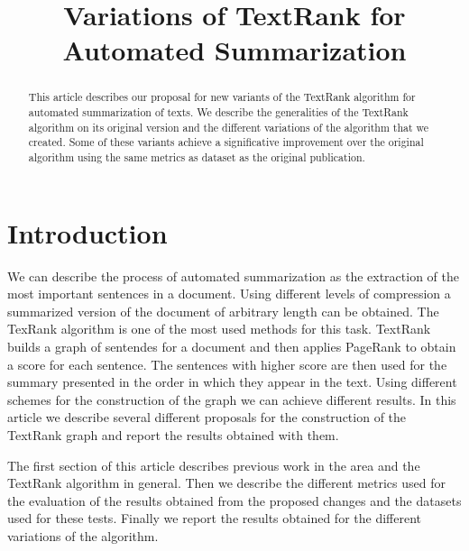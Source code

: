 \documentclass{llncs}
\begin{document}
\frontmatter

\title{Variations of TextRank for Automated Summarization}


\maketitle

\begin{abstract}
This article describes our proposal for new variants of the TextRank algorithm for automated summarization of texts. We describe the generalities of the TextRank algorithm on its original version and the different variations of the algorithm that we created. Some of these variants achieve a significative improvement over the original algorithm using the same metrics as dataset as the original publication. 

\end{abstract}

\section{Introduction}
We can describe the process of automated summarization as the extraction of the most important sentences in a document. Using different levels of compression a summarized version of the document of arbitrary length can be obtained. The TexRank algorithm is one of the most used methods for this task. TextRank builds a graph of sentendes for a document and then applies PageRank to obtain a score for each sentence. The sentences with higher score are then used for the summary presented in the order in which they appear in the text. Using different schemes for the construction of the graph we can achieve different results. In this article we describe several different proposals for the construction of the TextRank graph and report the results obtained with them.

The first section of this article describes previous work in the area and the TextRank algorithm in general. Then we describe the different metrics used for the evaluation of the results obtained from the proposed changes and the datasets used for these tests. Finally we report the results obtained for the different variations of the algorithm.
\end{document}
